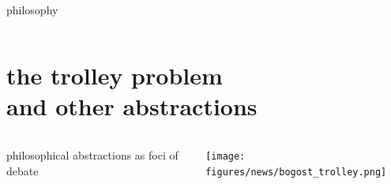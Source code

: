 \documentclass[aspectratio=169,17pt]{beamer} %
\begin{document}
\begin{frame}{philosophy}
\begin{columns}
\begin{column}{0.5\textwidth}




\end{column}
\end{columns}

\end{frame}


\section{the trolley problem\\and other abstractions}


\begin{frame}[plain]
    \begin{columns}
    \begin{column}{0.4\textwidth}
    philosophical abstractions as foci of debate
    \end{column}
    \begin{column}{0.6\textwidth}
    \texttt{[image: figures/news/bogost\_trolley.png]}
    \end{column}
    \end{columns}

\end{frame}
\end{document}
